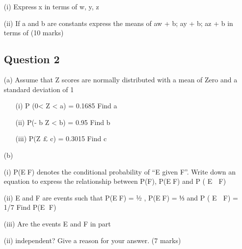 \documentclass[]{report}
\begin{document}
\begin{enumerate}[(i)]
\begin{itemize}
	SubS 1	16	18	19	22	22	25	28	28	28	31	33	27	23
	SubS 2	22	23	25	27	27	28	30	32	33	35	36	38	38
	
	(a)	You are required to construct a box plot for each plant’s output and to comment on the salient features of each plot.  Is there evidence from the box plots to reject the hypothesis that there is no difference in the defect figures between the two facilities?  Use the box plot to justify your comments.
	(8 marks)
	
	(b)	Compare and contrast the Mean and the Median as measures of location
	(2 marks)
	
	(c)	The mean of three numbers: w, y, z is x
	
	\item[(i)]Expressx in terms of w, y, z
	\item[(ii)] If a and b are constants express the means of 
	aw + b;   ay + b;   az + b
	in terms of  
	(10 marks)
	
	
	\subsection{Question 2}
	
	(a)	
	Assume that Z scores are normally distributed with a mean of Zero and a
	standard deviation of 1
	
	\begin{itemize} 
		\item[(i)] 	P (0< Z < a)  =  0.1685 			 Find   a 
		\item[(ii)]            P(- b \leq Z < b) =  0.95		            	 Find   b
		\item[(iii)]             P(Z £ c)  =       0.3015 			 Find   c
	\end{itemize}
	
	
	(b) 	\item[(i)]P(EF) denotes the conditional probability of “E given F”. 
	Write down an equation to express the relationship between 
	P(F), P(EF) and P ( E  F)
	\item[(ii)]E and F are events such that   P(EF) = ½ ,   P(EF) =  ⅓ 
	and P ( E  F) = 1/7
	Find P(E F)
	\item[(iii)]Are the events E and F in part \item[(ii)]independent? Give a reason for your answer.										(7 marks)	
	

\end{itemize}
\end{enumerate}
\end{document}
